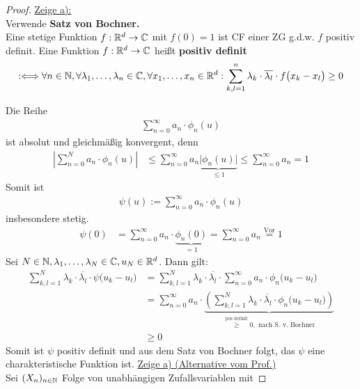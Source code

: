 \begin{proof}
	\underline{Zeige a):}\\
	Verwende
	\textbf{Satz von Bochner.}\\
		Eine stetige Funktion $f:\mathbb{R}^d\to\mathbb{C}$ mit $f(0)=1$ ist CF einer ZG g.d.w. $f$ positiv definit.\nl
	Eine Funktion $f:\mathbb{R}^d\to\mathbb{C}$ heißt \textbf{positiv definit}
	\begin{align*}
		:\Longleftrightarrow
		\forall n\in\mathbb{N},\forall\lambda_1,\ldots,\lambda_n\in\mathbb{C},\forall x_1,\ldots,x_n\in\mathbb{R}^d:
		\sum\limits_{k,l=1}^n\lambda_k\cdot\overline{\lambda_l}\cdot f\big(x_k-x_l\big)\geq0
	\end{align*}
	
	Die Reihe
	\begin{align*}
		\sum\limits_{n=0}^\infty a_n\cdot\phi_n(u)
	\end{align*}
	ist absolut und gleichmäßig konvergent, denn
	\begin{align*}
		\left|\sum\limits_{n=0}^N a_n\cdot\phi_n(u)\right|
		&\leq\sum\limits_{n=0}^\infty a_n\underbrace{\big|\phi_n(u)\big|}_{\leq1}
		\leq\sum\limits_{n=0}^\infty a_n=1
	\end{align*}
	Somit ist
	\begin{align*}
		\psi(u):=\sum\limits_{n=0}^\infty a_n\cdot\phi_n(u)
	\end{align*}
	insbesondere stetig.
	\begin{align*}
		\psi(0)
		&=\sum\limits_{n=0}^\infty a_n\cdot\underbrace{\phi_n(0)}_{=1}
		=\sum\limits_{n=0}^\infty a_n\overset{\text{Vor}}{=}1
	\end{align*}
	Sei $N\in\mathbb{N},\lambda_1,\ldots,\lambda_N\in\mathbb{C},u_N\in\mathbb{R}^d$.
	Dann gilt:
	\begin{align*}
		\sum\limits_{k,l=1}^N\lambda_k\cdot\overline{\lambda_l}\cdot\psi\big(u_k-u_l\big)
		&=\sum\limits_{k,l=1}^N\lambda_k\cdot\overline{\lambda_l}\cdot\sum\limits_{n=0}^\infty a_n\cdot\phi_n\big(u_k-u_l\big)\\
		&=\sum\limits_{n=0}^\infty a_n\cdot\underbrace{\left(\sum\limits_{k,l=1}^N\lambda_k\cdot\overline{\lambda_l}\cdot\phi_n\big(u_k-u_l\big)\right)}_{\overset{\text{pos definit}}{\geq}0, \text{ nach S. v. Bochner}}\\
		&\geq0
	\end{align*}		
	Somit ist $\psi$ positiv definit und aus dem Satz von Bochner folgt, das $\psi$ eine charakteristische Funktion ist.\nl
	\underline{Zeige a) (Alternative vom Prof.)}\\
	Sei $(X_n)_{n\in\mathbb{N}}$ Folge von unabhängigen Zufallsvariablen mit

\end{proof}
